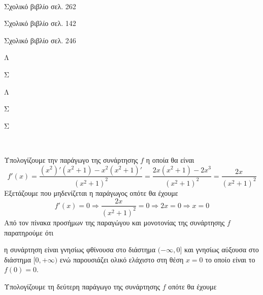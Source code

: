 \documentclass[internet]{diag-pan-xelatex}
\begin{document}
\begin{thema}
\item \mbox{}\\\vspace{-5mm}
\begin{erwthma}
\item Σχολικό βιβλίο σελ. 262
\item Σχολικό βιβλίο σελ. 142
\item Σχολικό βιβλίο σελ. 246
\item \begin{multicols}{5}
\begin{rlist}
\item Λ
\item Σ
\item Λ
\item Σ
\item Σ
\end{rlist}
\end{multicols}
\end{erwthma}
\item \mbox{}\\\vspace{-5mm}
\begin{erwthma}
\item Υπολογίζουμε την παράγωγο της συνάρτησης $ f $ η οποία θα είναι 
\[ f'(x)=\frac{\left(x^2\right)'\left( x^2+1\right)-x^2\left( x^2+1\right)' }{\left( x^2+1\right)^2}=\frac{2x\left( x^2+1\right)-2x^3}{\left( x^2+1\right)^2}=\frac{2x}{\left( x^2+1\right)^2} \]
Εξετάζουμε που μηδενίζεται η παράγωγος οπότε θα έχουμε \[ f'(x)=0\Rightarrow \frac{2x}{\left( x^2+1\right)^2}=0\Rightarrow 2x=0\Rightarrow x=0 \]
Από τον πίνακα προσήμων της παραγώγου και μονοτονίας της συνάρτησης $ f $ παρατηρούμε ότι
\begin{center}
\end{center}
η συνάρτηση είναι γνησίως φθίνουσα στο διάστημα $ (-\infty,0] $ και γνησίως αύξουσα στο διάστημα $ [0,+\infty) $ ενώ παρουσιάζει ολικό ελάχιστο στη θέση $ x=0 $ το οποίο είναι το $ f(0)=0 $.\\
\item Υπολογίζουμε τη δεύτερη παράγωγο της συνάρτησης $ f $ οπότε θα έχουμε

\end{erwthma}
\end{thema}
\end{document}
